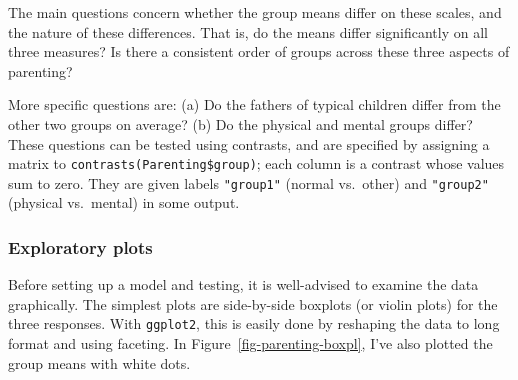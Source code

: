\documentclass[
  letterpaper,
  10pt,
  krantz2]{krantz}
\makeatletter
\newenvironment{Shaded}{\begin{snugshade}}{\end{snugshade}}
\newcommand{\AttributeTok}[1]{\textcolor[rgb]{0.40,0.45,0.13}{#1}}
\newcommand{\CommentTok}[1]{\textcolor[rgb]{0.37,0.37,0.37}{#1}}
\newcommand{\DecValTok}[1]{\textcolor[rgb]{0.68,0.00,0.00}{#1}}
\newcommand{\FunctionTok}[1]{\textcolor[rgb]{0.28,0.35,0.67}{#1}}
\newcommand{\NormalTok}[1]{\textcolor[rgb]{0.00,0.23,0.31}{#1}}
\newcommand{\OtherTok}[1]{\textcolor[rgb]{0.00,0.23,0.31}{#1}}
\newcommand{\SpecialCharTok}[1]{\textcolor[rgb]{0.37,0.37,0.37}{#1}}
\newcommand{\StringTok}[1]{\textcolor[rgb]{0.13,0.47,0.30}{#1}}
\newenvironment{kframe}{%
  \medskip{}
  \setlength{\fboxsep}{.8em}
  \def\at@end@of@kframe{}%
  \ifinner\ifhmode%
  \def\at@end@of@kframe{\end{minipage}}%
  \begin{minipage}{\columnwidth}%
  \fi\fi%
  \def\FrameCommand##1{\hskip\@totalleftmargin \hskip-\fboxsep
  \colorbox{shadecolor}{##1}\hskip-\fboxsep
      \hskip-\linewidth \hskip-\@totalleftmargin \hskip\columnwidth}%
  \MakeFramed {\advance\hsize-\width
    \@totalleftmargin\z@ \linewidth\hsize
    \@setminipage}}%
{\par\unskip\endMakeFramed%
  \at@end@of@kframe}
\renewenvironment{Shaded}{\begin{kframe}}{\end{kframe}}
\makeatother
\begin{document}
The main questions concern whether the group means differ on these
scales, and the nature of these differences. That is, do the means
differ significantly on all three measures? Is there a consistent order
of groups across these three aspects of parenting?

More specific questions are: (a) Do the fathers of typical children
differ from the other two groups on average? (b) Do the physical and
mental groups differ? These questions can be tested using contrasts, and
are specified by assigning a matrix to
\texttt{contrasts(Parenting\$group)}; each column is a contrast whose
values sum to zero. They are given labels \texttt{"group1"} (normal
vs.~other) and \texttt{"group2"} (physical vs.~mental) in some output.

\begin{Shaded}
\end{Shaded}

\subsubsection*{Exploratory plots}\label{exploratory-plots}

Before setting up a model and testing, it is well-advised to examine the
data graphically. The simplest plots are side-by-side boxplots (or
violin plots) for the three responses. With \texttt{ggplot2}, this is
easily done by reshaping the data to long format and using faceting. In
Figure~\ref{fig-parenting-boxpl}, I've also plotted the group means with
white dots.
\end{document}
